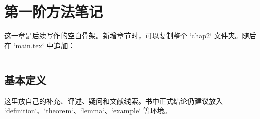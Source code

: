 \documentclass[../main.tex]{subfiles}
\begin{document}
\chapter{第一阶方法笔记}

这一章是后续写作的空白骨架。新增章节时，可以复制整个 `chap2` 文件夹。随后在 `main.tex` 中追加：

\begin{verbatim}

\end{verbatim}

\section{基本定义}

\begin{note}[写作提醒]
这里放自己的补充、评述、疑问和文献线索。书中正式结论仍建议放入 `definition`、`theorem`、`lemma`、`example` 等环境。
\end{note}
\end{document}
